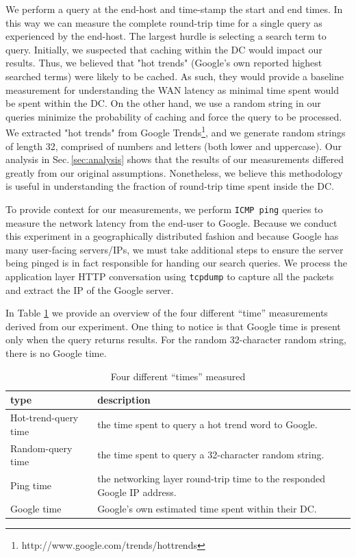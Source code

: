 We perform a query at the end-host and time-stamp the start and end times. In this way we can measure the complete round-trip time for a single query as experienced by the end-host. The largest hurdle is selecting a search term to query. Initially, we suspected that caching within the DC would impact our results. Thus, we believed that "hot trends" (Google's own reported highest searched terms) were likely to be cached. As such, they would provide a baseline measurement for understanding the WAN latency as minimal time spent would be spent within the DC. On the other hand, we use a random string in our  queries minimize the probability of caching and force the query to be processed. We extracted "hot trends" from Google Trends\footnote{http://www.google.com/trends/hottrends}, and we generate random strings of length 32, comprised of numbers and letters (both lower and uppercase). Our analysis in Sec.\,\ref{sec:analysis} shows that the results of our measurements differed greatly from our original assumptions. Nonetheless, we believe this methodology is useful in understanding the fraction of round-trip time spent inside the DC.

To provide context for our measurements, we perform \texttt{ICMP ping} queries to measure the network latency from the end-user to Google. Because we conduct this experiment in a geographically distributed fashion and because Google has many user-facing servers/IPs, we must take additional steps to ensure the server being pinged is in fact responsible for handing our search queries. We process the application layer HTTP conversation using \texttt{tcpdump} to capture all the packets and extract the IP of the Google server.
 
In Table \ref{tab:DC_method} we provide an overview of the four different ``time'' measurements derived from our experiment. One thing to notice is that Google time is present only when the query returns results. For the random 32-character random string, there is no Google time.

\begin{table}
  \begin{tabular}{p{2.8cm} | p{5cm}}
    \hline
    type & description \\
    \hline
    Hot-trend-query time & the time spent to query a hot trend word to Google. \\
    Random-query time & the time spent to query a 32-character random string.  \\
    Ping time & the networking layer round-trip time to the responded Google IP address. \\
    Google time & Google's own estimated time spent within their DC. \\
    \hline
  \end{tabular}
  \vspace{1em}
  \caption{Four different ``times'' measured}
  \label{tab:DC_method}
\end{table}


